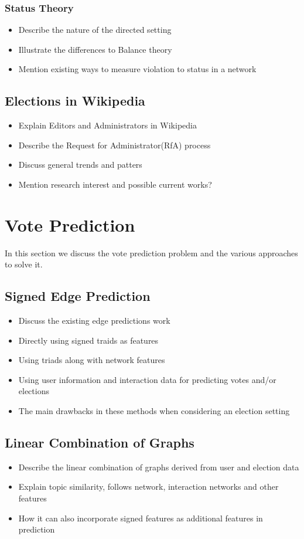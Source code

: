 \subsection{Status Theory}
\begin{itemize}
    \item Describe the nature of the directed setting
    \item Illustrate the differences to Balance theory
    \item Mention existing ways to measure violation to status in a network
\end{itemize}

\section{Elections in Wikipedia}
\begin{itemize}
    \item Explain Editors and Administrators in Wikipedia
    \item Describe the Request for Administrator(RfA) process
    \item Discuss general trends and patters
    \item Mention research interest and possible current works?
\end{itemize}

\chapter{Vote Prediction}
In this section we discuss the vote prediction problem and the various approaches to solve it.

\section{Signed Edge Prediction}
\begin{itemize}
    \item Discuss the existing edge predictions work
    \item Directly using signed traids as features
    \item Using triads along with network features
    \item Using user information and interaction data for predicting votes and/or elections
    \item The main drawbacks in these methods when considering an election setting
\end{itemize}
\section{Linear Combination of Graphs}
\begin{itemize}
    \item Describe the linear combination of graphs derived from user and election data
    \item Explain topic similarity, follows network, interaction networks and other features
    \item How it can also incorporate signed features as additional features in prediction
\end{itemize}

